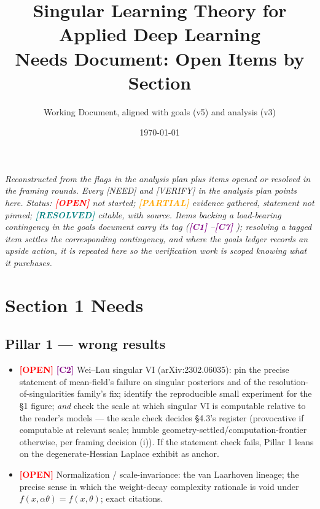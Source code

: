 \documentclass[11pt]{article}
\title{\textbf{Singular Learning Theory for Applied Deep Learning}\\[8pt]
\large Needs Document: Open Items by Section}
\author{Working Document, aligned with goals (v5) and analysis (v3)}
\date{\today}
\newcommand{\open}{\textcolor{red}{\textbf{[OPEN]}} }
\newcommand{\partialr}{\textcolor{orange}{\textbf{[PARTIAL]}} }
\newcommand{\cref}[1]{\textcolor{purple}{\textbf{[#1]}} }
\begin{document}
\maketitle

\noindent\emph{Reconstructed from the flags in the analysis plan plus
items opened or resolved in the framing rounds. Every [NEED] and
[VERIFY] in the analysis plan points here. Status: \open{} not started;
\partialr{} evidence gathered, statement not pinned;
\textcolor{teal}{\textbf{[RESOLVED]}} citable, with source. Items
backing a load-bearing contingency in the goals document carry its tag
(\cref{C1}--\cref{C7}); resolving a tagged item settles the
corresponding contingency, and where the goals ledger records an upside
action, it is repeated here so the verification work is scoped knowing
what it purchases.}

\section{Section 1 Needs}

\subsection*{Pillar 1 --- wrong results}
\begin{itemize}[itemsep=4pt]
\item \open \cref{C2} Wei--Lau singular VI (arXiv:2302.06035): pin the
precise statement of mean-field's failure on singular posteriors and of
the resolution-of-singularities family's fix; identify the reproducible
small experiment for the \S1 figure; \emph{and} check the scale at which
singular VI is computable relative to the reader's models --- the scale
check decides \S4.3's register (provocative if computable at relevant
scale; humble geometry-settled/computation-frontier otherwise, per
framing decision (i)). If the statement check fails, Pillar 1 leans on
the degenerate-Hessian Laplace exhibit as anchor.
\item \open Normalization / scale-invariance: the van Laarhoven lineage;
the precise sense in which the weight-decay complexity rationale is void
under $f(x,\alpha\theta)=f(x,\theta)$; exact citations.
\end{itemize}
\end{document}
